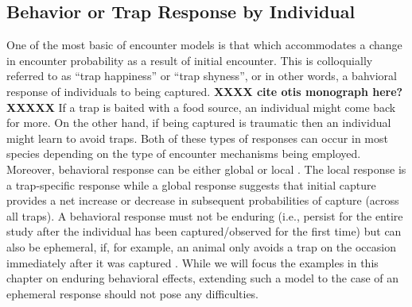 \begin{comment}
XXX This can all be deleted. I put a comment in above. The idea is
that space usage or resource selection is manifest as a covariate at
the trap level. This is the whole point of the RSF chapter and it is
also a point that you alluded to above. XXX

XXX ANDY - Can you clarify the second part of this paragraph??
If the trap-specific covariate describes local conditions, e.g., of
the habitat, this suggests a more fundamental role of encounter
probability as being related to space usage or resource
selection. Indeed, we show in Chapt. \ref{chapt.rsf} how, explicit
formulation of classical resource selection models yield precisely an
additive model of the XXXWHAT FORM?XXX form here, where the covariate
$z({\bf x})$ is the same as that contained in the resource selection
model. XXX ISNT Z OUR INDICATOR OF PART OF THE POPULATION??XXX
\end{comment}

\subsection{Behavior or Trap Response by Individual}

One of the most basic of encounter models is that which accommodates a
change in encounter probability as a result of initial encounter.
This is colloquially referred to as ``trap happiness'' or ``trap shyness'', or in other words, a
bahvioral response of individuals to being captured. {\bf XXXX cite
  otis monograph here? XXXXX}
If a trap is baited
with a food source, an individual might come back for
more. On the other hand, if being captured is traumatic then an
individual might learn to avoid traps. Both of these types of
responses can occur in most species depending on the type of encounter
mechanisms being employed. Moreover, behavioral response can be either
global \citep{gardner_etal:2010} or local  \citep{royle_etal:2009jwm}.
The local response is a trap-specific response 
while a global response suggests that initial capture provides a net
increase or decrease in subsequent probabilities of capture (across
all traps). A behavioral response must not be enduring (i.e., persist
for the entire study after the individual has been captured/observed
for the first time) but can also be ephemeral, if, for example, an
animal only avoids a trap on the occasion immediately after it was
captured \citep{royle:2008B, yang_chao:2005}. While we will focus the
examples in this chapter on enduring behavioral effects, extending
such a model to the case of an ephemeral response should not pose any
difficulties.

